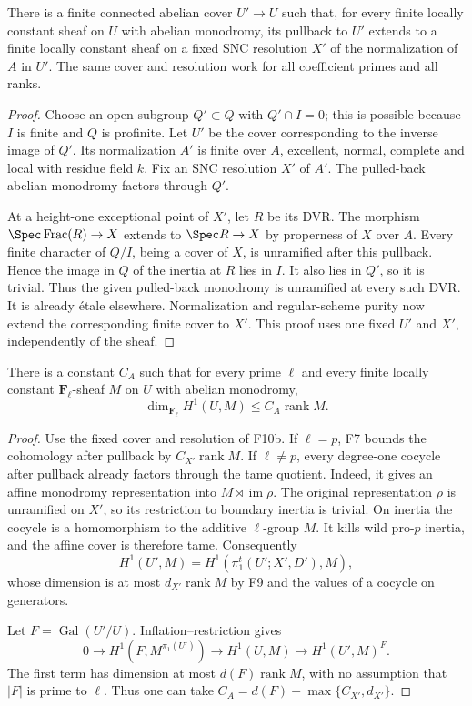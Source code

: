 \begin{corollary}
There is a finite connected abelian cover $U'\to U$ such that,
for every finite locally constant sheaf on $U$ with abelian
monodromy, its pullback to $U'$ extends to a finite locally constant
sheaf on a fixed SNC resolution $X'$ of the normalization of $A$
in $U'$. The same cover and resolution work for all coefficient
primes and all ranks.
\end{corollary}
\begin{proof}
Choose an open subgroup $Q'\subset Q$ with $Q'\cap I=0$; this
is possible because $I$ is finite and $Q$ is profinite. Let $U'$
be the cover corresponding to the inverse image of $Q'$.
Its normalization $A'$ is finite over $A$, excellent, normal,
complete and local with residue field $k$. Fix an SNC resolution
$X'$ of $A'$. The pulled-back abelian monodromy factors through
$Q'$.

At a height-one exceptional point of $X'$, let $R$ be its DVR.
The morphism $\Spec\operatorname{Frac}(R)\to X$ extends to
$\Spec R\to X$ by properness of $X$ over $A$. Every finite
character of $Q/I$, being a cover of $X$, is unramified after this
pullback. Hence the image in $Q$ of the inertia at $R$ lies in
$I$. It also lies in $Q'$, so it is trivial. Thus the given pulled-back
monodromy is unramified at every such DVR. It is already \'etale
elsewhere. Normalization and regular-scheme purity now extend the
corresponding finite cover to $X'$. This proof uses one fixed
$U'$ and $X'$, independently of the sheaf.
\end{proof}

\begin{proposition}
There is a constant $C_A$ such that for every prime $\ell$ and
every finite locally constant $\mathbf F_\ell$-sheaf $M$ on $U$
with abelian monodromy,
\[
                       \dim_{\mathbf F_\ell}H^1(U,M)
                       \leq C_A\operatorname{rank}M.
 \tag{F10.7}
\]
\end{proposition}
\begin{proof}
Use the fixed cover and resolution of F10b. If $\ell=p$, F7
bounds the cohomology after pullback by $C_{X'}\operatorname{rank}M$.
If $\ell\ne p$, every degree-one cocycle after pullback already
factors through the tame quotient. Indeed, it gives an affine
monodromy representation into $M\rtimes\operatorname{im}\rho$.
The original representation $\rho$ is unramified on $X'$, so its
restriction to boundary inertia is trivial. On inertia the cocycle
is a homomorphism to the additive $\ell$-group $M$. It kills wild
pro-$p$ inertia, and the affine cover is therefore tame.
Consequently
\[
 H^1(U',M)=H^1(\pi_1^t(U';X',D'),M),
\]
whose dimension is at most $d_{X'}\operatorname{rank}M$ by F9
and the values of a cocycle on generators.

Let $F=\operatorname{Gal}(U'/U)$. Inflation--restriction gives
\[
 0\to H^1(F,M^{\pi_1(U')})\to H^1(U,M)
          \to H^1(U',M)^F.
\]
The first term has dimension at most $d(F)\operatorname{rank}M$,
with no assumption that $|F|$ is prime to $\ell$.
Thus one can take
$C_A=d(F)+\max\{C_{X'},d_{X'}\}$.
\end{proof}

